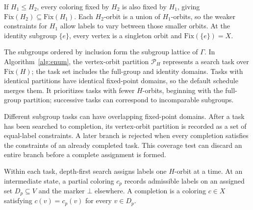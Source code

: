 \documentclass[a5paper, 10pt]{article}
\begin{document}
If $H_1\leq H_2$, every coloring fixed by $H_2$ is also fixed by $H_1$, giving $\mathrm{Fix}(H_2)\subseteq\mathrm{Fix}(H_1)$. Each $H_2$-orbit is a union of $H_1$-orbits, so the weaker constraints for $H_1$ allow labels to vary between those smaller orbits. At the identity subgroup $\{e\}$, every vertex is a singleton orbit and $\mathrm{Fix}(\{e\})=X$.

The subgroups ordered by inclusion form the subgroup lattice of $\Gamma$. In Algorithm~\ref{alg:enum}, the vertex-orbit partition $\mathcal{P}_H$ represents a search task over $\mathrm{Fix}(H)$; the task set includes the full-group and identity domains. Tasks with identical partitions have identical fixed-point domains, so the default schedule merges them. It prioritizes tasks with fewer $H$-orbits, beginning with the full-group partition; successive tasks can correspond to incomparable subgroups.

Different subgroup tasks can have overlapping fixed-point domains. After a task has been searched to completion, its vertex-orbit partition is recorded as a set of equal-label constraints. A later branch is rejected when every completion satisfies the constraints of an already completed task. This coverage test can discard an entire branch before a complete assignment is formed.

Within each task, depth-first search assigns labels one $H$-orbit at a time. At an intermediate state, a partial coloring $c_p$ records admissible labels on an assigned set $D_p\subseteq V$ and the marker $\bot$ elsewhere. A completion is a coloring $c\in X$ satisfying $c(v)=c_p(v)$ for every $v\in D_p$.
\end{document}
